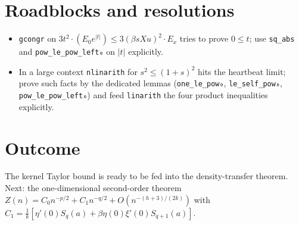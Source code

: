 \documentclass[11pt]{article}
\begin{document}
\section{Roadblocks and resolutions}
\begin{itemize}
\item \texttt{gcongr} on $3t^2\cdot(E_0e^{|t|})\le3(\beta sXu)^2\cdot E_x$ tries to prove $0\le t$; use
\texttt{sq\_abs} and \texttt{pow\_le\_pow\_left₀} on $|t|$ explicitly.
\item In a large context \texttt{nlinarith} for $s^2\le(1+s)^2$ hits the heartbeat limit; prove such
facts by the dedicated lemmas (\texttt{one\_le\_pow₀}, \texttt{le\_self\_pow₀},
\texttt{pow\_le\_pow\_left₀}) and feed \texttt{linarith} the four product inequalities explicitly.
\end{itemize}

\section{Outcome}
The kernel Taylor bound is ready to be fed into the density-transfer theorem. Next: the one-dimensional
second-order theorem $Z(n)=C_0n^{-p/2}+C_1n^{-q/2}+O(n^{-(h+3)/(2k)})$ with
$C_1=\frac1k[\eta'(0)S_q(a)+\beta\eta(0)\xi'(0)S_{q+1}(a)]$.
\end{document}

